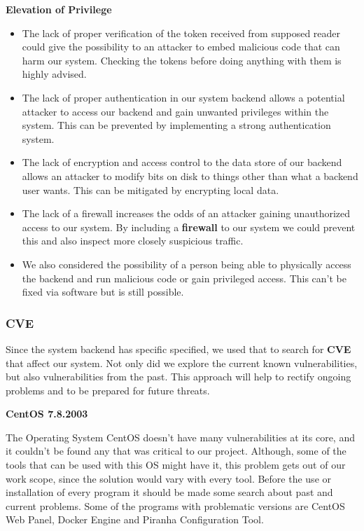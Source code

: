 \textbf{Elevation of Privilege}
\begin{itemize}
    \item The lack of proper verification of the token received from supposed reader could give the possibility to an attacker to embed malicious code that can harm our system. Checking the tokens before doing anything with them is highly advised.
    \item The lack of proper authentication in our system backend allows a potential attacker to access our backend and gain unwanted privileges within the system. This can be prevented by implementing a strong authentication system.
    \item The lack of encryption and access control to the data store of our backend allows an attacker to modify bits on disk to things other than what a backend user wants. This can be mitigated by encrypting local data.
    \item The lack of a firewall increases the odds of an attacker gaining unauthorized access to our system. By including a \textbf{firewall}\cite{firewall} to our system we could prevent this and also inspect more closely suspicious traffic.
    \item We also considered the possibility of a person being able to physically access the backend and run malicious code or gain privileged access. This can't be fixed via software but is still possible.
\end{itemize}

\subsubsection{CVE}

Since the system backend has specific specified, we used that to search for \textbf{CVE} that affect our system. Not only did we explore the current known vulnerabilities, but also vulnerabilities from the past. This approach will help to rectify ongoing problems and to be prepared for future threats.


\vspace{0.4cm}

\textbf{CentOS 7.8.2003}

The Operating System CentOS doesn't have many vulnerabilities at its core, and it couldn't be found any that was critical to our project. Although, some of the tools that can be used with this OS might have it, this problem gets out of our work scope, since the solution would vary with every tool. Before the use or installation of every program it should be made some search about past and current problems. Some of the  programs with problematic versions are CentOS Web Panel, Docker Engine and  Piranha Configuration Tool.


